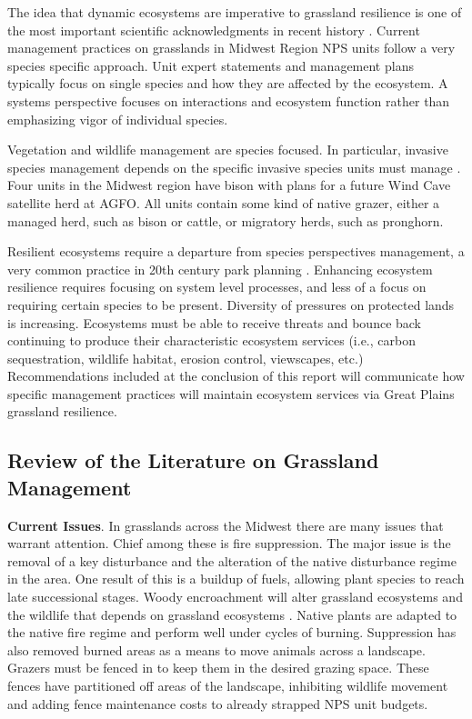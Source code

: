 The idea that dynamic ecosystems are imperative to grassland resilience is one of the most important scientific acknowledgments in recent history \citep{thomas1996}. 
Current management practices on grasslands in Midwest Region NPS units follow a very species specific approach. 
Unit expert statements and management plans typically focus on single species and how they are affected by the ecosystem.
A systems perspective focuses on interactions and ecosystem function rather than emphasizing vigor of individual species.

Vegetation and wildlife management are species focused. 
In particular, invasive species management depends on the specific invasive species units must manage \citep{bestelmeyer2012}. 
Four units in the Midwest region have bison with plans for a future Wind Cave satellite herd at AGFO. 
All units contain some kind of native grazer, either a managed herd, such as bison or cattle, or migratory herds, such as pronghorn.

Resilient ecosystems require a departure from species perspectives
management, a very common practice in 20th century park planning \citep{lebel2006}. 
Enhancing ecosystem resilience requires focusing on system level
processes, and less of a focus on requiring certain species to be
present. 
Diversity of pressures on protected lands is increasing.
Ecosystems must be able to receive threats and bounce back continuing to produce their characteristic ecosystem services (i.e., carbon sequestration, wildlife habitat, erosion control, viewscapes, etc.) 
Recommendations included at the conclusion of this report will communicate how specific management practices will maintain ecosystem services via Great Plains grassland resilience.

\hypertarget{LitReview}{%
\subsection{Review of the Literature on Grassland Management}\label{LitReview}}

\textbf{Current Issues}. In grasslands across the Midwest there are many issues that warrant attention. 
Chief among these is fire suppression.
The major issue is the removal of a key disturbance and the alteration of the native disturbance regime in the area. 
One result of this is a buildup of fuels, allowing plant species to reach late successional stages. 
Woody encroachment will alter grassland ecosystems and the wildlife that depends on grassland ecosystems \citep{fuhlendorf2012}.
Native plants are adapted to the native fire regime and perform well under cycles of burning. 
Suppression has also removed burned areas as a means to move animals across a landscape. 
Grazers must be fenced in to keep them in the desired grazing space. 
These fences have partitioned off areas of the landscape, inhibiting wildlife movement and adding fence maintenance costs to already strapped NPS unit budgets.

